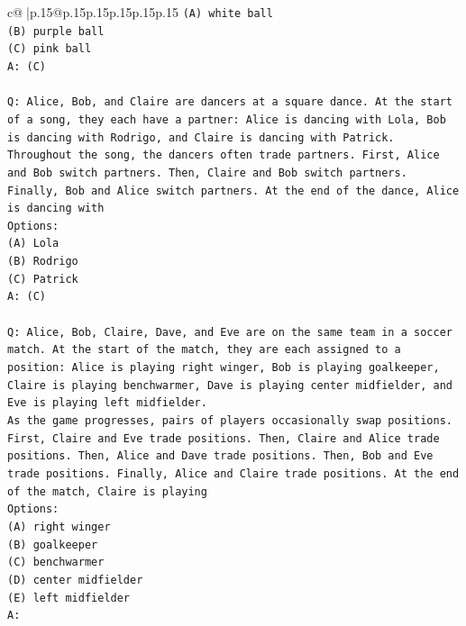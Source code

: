 \documentclass{article}
\begin{document}
{\begin{supertabular}{c@{$\;$}|p{.15\linewidth}@{}p{.15\linewidth}p{.15\linewidth}p{.15\linewidth}p{.15\linewidth}p{.15\linewidth}}
{{{\texttt{(A) white ball} \\
\texttt{(B) purple ball} \\
\texttt{(C) pink ball} \\
\texttt{A: (C)} \\
\\ 
\texttt{Q: Alice, Bob, and Claire are dancers at a square dance. At the start of a song, they each have a partner: Alice is dancing with Lola, Bob is dancing with Rodrigo, and Claire is dancing with Patrick.} \\
\texttt{Throughout the song, the dancers often trade partners. First, Alice and Bob switch partners. Then, Claire and Bob switch partners. Finally, Bob and Alice switch partners. At the end of the dance, Alice is dancing with} \\
\texttt{Options:} \\
\texttt{(A) Lola} \\
\texttt{(B) Rodrigo} \\
\texttt{(C) Patrick} \\
\texttt{A: (C)} \\
\\ 
\texttt{Q: Alice, Bob, Claire, Dave, and Eve are on the same team in a soccer match. At the start of the match, they are each assigned to a position: Alice is playing right winger, Bob is playing goalkeeper, Claire is playing benchwarmer, Dave is playing center midfielder, and Eve is playing left midfielder.} \\
\texttt{As the game progresses, pairs of players occasionally swap positions. First, Claire and Eve trade positions. Then, Claire and Alice trade positions. Then, Alice and Dave trade positions. Then, Bob and Eve trade positions. Finally, Alice and Claire trade positions. At the end of the match, Claire is playing} \\
\texttt{Options:} \\
\texttt{(A) right winger} \\
\texttt{(B) goalkeeper} \\
\texttt{(C) benchwarmer} \\
\texttt{(D) center midfielder} \\
\texttt{(E) left midfielder} \\
\texttt{A:} \\
            }
        }
    }
     \\ \\


\end{supertabular}}
\end{document}
